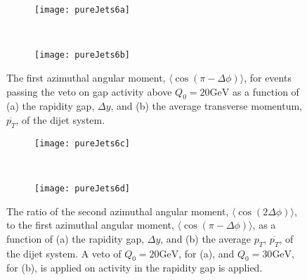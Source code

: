 	\begin{figure}[bth]
		\centering
		\begin{subfigure}[b]{0.48\textwidth}
			\texttt{[image: pureJets6a]}
			\caption{}
			\label{fig:}
		\end{subfigure}
		~
		\begin{subfigure}[b]{0.48\textwidth}
			\texttt{[image: pureJets6b]}
			\caption{}
			\label{fig:}
		\end{subfigure}
		\caption{The first azimuthal angular moment, $\langle \cos(\pi-\Delta\phi)\rangle$,
		for events passing the veto on gap activity above $Q_0=20\text{GeV}$ as a function
		of (a) the rapidity gap, $\Delta y$, and (b) the average transverse momentum, $\overline{p_T}$,
		of the dijet system.}
		\label{fig:atlasPJ5}
	\end{figure}

	\begin{figure}[bth]
		\begin{subfigure}[b]{0.48\textwidth}
			\texttt{[image: pureJets6c]}
			\caption{}
			\label{fig:}
		\end{subfigure}
		~
		\begin{subfigure}[b]{0.48\textwidth}
			\texttt{[image: pureJets6d]}
			\caption{}
			\label{fig:}
		\end{subfigure}
		\caption{The ratio of the second azimuthal angular moment,
		$\langle \cos(2\Delta\phi)\rangle$, to the first azimuthal angular moment,
		$\langle \cos(\pi-\Delta\phi)\rangle$, as a function of (a) the rapidity gap,
		$\Delta y$, and (b) the average $p_T$, $\overline{p_T}$, of the dijet system.  A
		veto of $Q_0=20\text{GeV}$, for (a), and $Q_0=30\text{GeV}$, for (b), is applied
		on activity in the rapidity gap is applied.}
		\label{fig:atlasPJ6}
	\end{figure}


